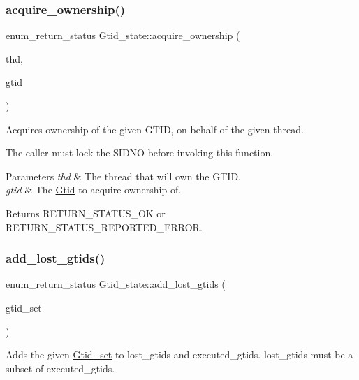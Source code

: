 \subsubsection{\texorpdfstring{acquire\+\_\+ownership()}{acquire\_ownership()}}
{\footnotesize\ttfamily enum\+\_\+return\+\_\+status Gtid\+\_\+state\+::acquire\+\_\+ownership (\begin{DoxyParamCaption}\item[{T\+HD $\ast$}]{thd,  }\item[{const \mbox{\hyperlink{structGtid}{Gtid}} \&}]{gtid }\end{DoxyParamCaption})}

Acquires ownership of the given G\+T\+ID, on behalf of the given thread.

The caller must lock the S\+I\+D\+NO before invoking this function.


\begin{DoxyParams}{Parameters}
{\em thd} & The thread that will own the G\+T\+ID. \\
\hline
{\em gtid} & The \mbox{\hyperlink{structGtid}{Gtid}} to acquire ownership of. \\
\hline
\end{DoxyParams}
\begin{DoxyReturn}{Returns}
R\+E\+T\+U\+R\+N\+\_\+\+S\+T\+A\+T\+U\+S\+\_\+\+OK or R\+E\+T\+U\+R\+N\+\_\+\+S\+T\+A\+T\+U\+S\+\_\+\+R\+E\+P\+O\+R\+T\+E\+D\+\_\+\+E\+R\+R\+OR. 
\end{DoxyReturn}
\mbox{\label{classGtid__state_abd5725a5688d62679a43c837d6bad8fb}} 
\subsubsection{\texorpdfstring{add\+\_\+lost\+\_\+gtids()}{add\_lost\_gtids()}}
{\footnotesize\ttfamily enum\+\_\+return\+\_\+status Gtid\+\_\+state\+::add\+\_\+lost\+\_\+gtids (\begin{DoxyParamCaption}\item[{const \mbox{\hyperlink{classGtid__set}{Gtid\+\_\+set}} $\ast$}]{gtid\+\_\+set }\end{DoxyParamCaption})}

Adds the given \mbox{\hyperlink{classGtid__set}{Gtid\+\_\+set}} to lost\+\_\+gtids and executed\+\_\+gtids. lost\+\_\+gtids must be a subset of executed\+\_\+gtids.

